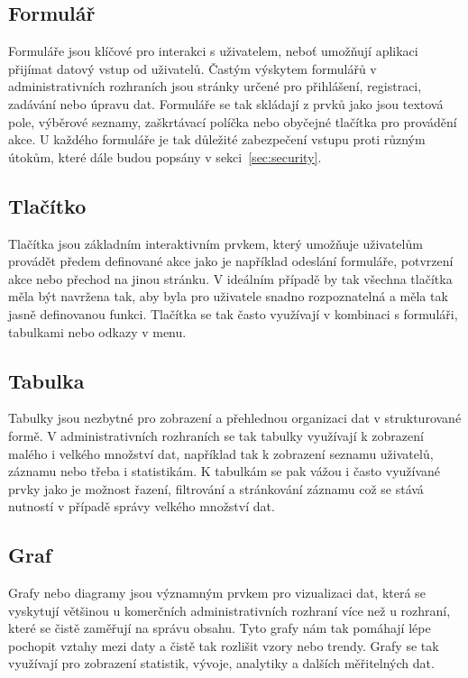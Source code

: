 \subsection*{Formulář}
\label{subsec:admin-tags-form}
Formuláře jsou klíčové pro interakci s uživatelem, neboť umožňují aplikaci přijímat datový vstup od uživatelů. Častým výskytem formulářů v administrativních rozhraních jsou stránky určené pro přihlášení, registraci, zadávání nebo úpravu dat. Formuláře se tak skládají z prvků jako jsou textová pole, výběrové seznamy, zaškrtávací políčka nebo obyčejné tlačítka pro provádění akce. U každého formuláře je tak důležité zabezpečení vstupu proti různým útokům, které dále budou popsány v sekci~\ref{sec:security}.

\subsection*{Tlačítko}
\label{subsec:admin-tags-button}
Tlačítka jsou základním interaktivním prvkem, který umožňuje uživatelům provádět předem definované akce jako je například odeslání formuláře, potvrzení akce nebo přechod na jinou stránku. V ideálním případě by tak všechna tlačítka měla být navržena tak, aby byla pro uživatele snadno rozpoznatelná a měla tak jasně definovanou funkci. Tlačítka se tak často využívají v kombinaci s formuláři, tabulkami nebo odkazy v menu.

\subsection*{Tabulka}
\label{subsec:admin-tags-table}
Tabulky jsou nezbytné pro zobrazení a přehlednou organizaci dat v strukturované formě. V administrativních rozhraních se tak tabulky využívají k zobrazení malého i velkého množství dat, například tak k zobrazení seznamu uživatelů, záznamu nebo třeba i statistikám. K tabulkám se pak vážou i často využívané prvky jako je možnost řazení, filtrování a stránkování záznamu což se stává nutností v případě správy velkého množství dat.

\subsection*{Graf}
\label{subsec:admin-tags-chart}
Grafy nebo diagramy jsou významným prvkem pro vizualizaci dat, která se vyskytují většinou u komerčních administrativních rozhraní více než u rozhraní, které se čistě zaměřují na správu obsahu. Tyto grafy nám tak pomáhají lépe pochopit vztahy mezi daty a čistě tak rozlišit vzory nebo trendy. Grafy se tak využívají pro zobrazení statistik, vývoje, analytiky a dalších měřitelných dat.

